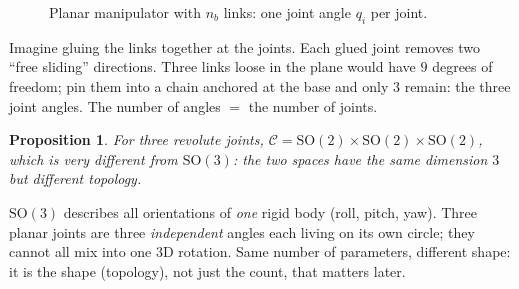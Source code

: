\documentclass[11pt,a4paper]{article}
\newcommand{\C}{\mathcal{C}}
\newcommand{\SO}{\mathrm{SO}}
\theoremstyle{definition}
\theoremstyle{plain}
\newtheorem{proposition}[definition]{Proposition}
\begin{document}
\begin{figure}[ht]
\centering
{}
\caption{Planar manipulator with $n_b$ links: one joint angle $q_i$ per joint.}
\end{figure}

\begin{intuition}
Imagine gluing the links together at the joints. Each glued joint removes two ``free sliding'' directions. Three links loose in the plane would have $9$ degrees of freedom; pin them into a chain anchored at the base and only $3$ remain: the three joint angles. The number of angles $=$ the number of joints.
\end{intuition}

\begin{proposition}\label{prop:so2-not-so3}
For three revolute joints, $\C=\SO(2)\times\SO(2)\times\SO(2)$, which is very different from $\SO(3)$: the two spaces have the same dimension $3$ but different topology.
\end{proposition}

\begin{intuition}
$\SO(3)$ describes all orientations of \emph{one} rigid body (roll, pitch, yaw). Three planar joints are three \emph{independent} angles each living on its own circle; they cannot all mix into one 3D rotation. Same number of parameters, different shape: it is the shape (topology), not just the count, that matters later.
\end{intuition}
\end{document}
